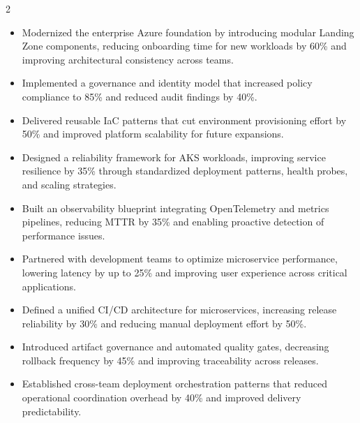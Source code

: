 \documentclass[10pt,a4paper,withhyper]{altacv}
\begin{document}
\begin{paracol}{2}
\cvevent{\textbf{\textcolor{maroon}{Azure Landing Zone Modernization Program}}}{}{}{}
\begin{justify}
\begin{itemize}
    \item Modernized the enterprise Azure foundation by introducing modular Landing Zone components, reducing onboarding time for new workloads by 60\% and improving architectural consistency across teams.
    \item Implemented a governance and identity model that increased policy compliance to 85\% and reduced audit findings by 40\%.
    \item Delivered reusable IaC patterns that cut environment provisioning effort by 50\% and improved platform scalability for future expansions.
\end{itemize}
\end{justify}

\divider

\cvevent{\textbf{\textcolor{maroon}{AKS Platform Reliability \& Observability Initiative}}}{}{}{}
\begin{justify}
\begin{itemize}
    \item Designed a reliability framework for AKS workloads, improving service resilience by 35\% through standardized deployment patterns, health probes, and scaling strategies.
    \item Built an observability blueprint integrating OpenTelemetry and metrics pipelines, reducing MTTR by 35\% and enabling proactive detection of performance issues.
    \item Partnered with development teams to optimize microservice performance, lowering latency by up to 25\% and improving user experience across critical applications.

\end{itemize}
\end{justify}
\medskip

\cvevent{\textbf{\textcolor{maroon}{Enterprise CI/CD Standardization Program}}}{}{}{}
\begin{justify}
\begin{itemize}
    \item Defined a unified CI/CD architecture for microservices, increasing release reliability by 30\% and reducing manual deployment effort by 50\%.
    \item Introduced artifact governance and automated quality gates, decreasing rollback frequency by 45\% and improving traceability across releases.
    \item Established cross-team deployment orchestration patterns that reduced operational coordination overhead by 40\% and improved delivery predictability.
\end{itemize}
\end{justify}


\end{paracol}
\end{document}
